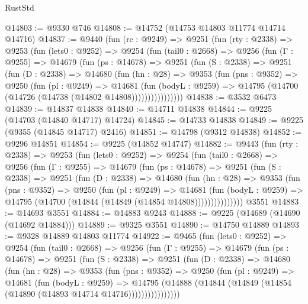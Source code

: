 \begin{lexlean}{RustStd}
\begin{coremodule}
@14803 := @9330 @746
@14808 := @14752 (@14753 @14803 @11774 @14714 @14716)
@14837 := @9440
    (fun (rc : @9249) =>
    @9251
      (fun (rty : @2338) =>
      @9253
        (fun (lets0 : @9252) =>
        @9254
          (fun (tail0 : @2668) =>
          @9256
            (fun (Γ : @9255) =>
            @14679
              (fun (ps : @14678) =>
              @9251
                (fun (S : @2338) =>
                @9251
                  (fun (D : @2338) =>
                  @14680
                    (fun (hn : @28) =>
                    @9353
                      (fun (pns : @9352) =>
                      @9250
                        (fun (pl : @9249) =>
                        @14681
                          (fun (bodyL : @9259) =>
                          @14795 (@14700 (@14726 (@14738 (@14802 @14808))))))))))))))))
@14838 := @3532 @6473
@14839 := @14837 @14838
@14840 := @14711 @14838
@14844 := @9225 (@14703 (@14840 @14717) @14724)
@14845 := @14733 @14838
@14849 := @9225 (@9355 (@14845 @14717) @2416)
@14851 := @14798 (@9312 @14838)
@14852 := @9296 @14851
@14854 := @9225 (@14852 @14747)
@14882 := @9443
    (fun (rty : @2338) =>
    @9253
      (fun (lets0 : @9252) =>
      @9254
        (fun (tail0 : @2668) =>
        @9256
          (fun (Γ : @9255) =>
          @14679
            (fun (ps : @14678) =>
            @9251
              (fun (S : @2338) =>
              @9251
                (fun (D : @2338) =>
                @14680
                  (fun (hn : @28) =>
                  @9353
                    (fun (pns : @9352) =>
                    @9250
                      (fun (pl : @9249) =>
                      @14681
                        (fun (bodyL : @9259) =>
                        @14795 (@14700 (@14844 (@14849 (@14854 @14808)))))))))))))))
    @3551
@14883 := @14693 @3551
@14884 := @14883 @9243
@14888 := @9225 (@14689 (@14690 (@14692 @14884)))
@14889 := @9325 @3551
@14890 := @14750 @14889
@14893 := @9328 @14889 @14803 @11774
@14922 := @9465
    (fun (lets0 : @9252) =>
    @9254
      (fun (tail0 : @2668) =>
      @9256
        (fun (Γ : @9255) =>
        @14679
          (fun (ps : @14678) =>
          @9251
            (fun (S : @2338) =>
            @9251
              (fun (D : @2338) =>
              @14680
                (fun (hn : @28) =>
                @9353
                  (fun (pns : @9352) =>
                  @9250
                    (fun (pl : @9249) =>
                    @14681
                      (fun (bodyL : @9259) =>
                      @14795
                        (@14888
                          (@14844 (@14849 (@14854 (@14890 (@14893 @14714 @14716))))))))))))))))

\end{coremodule}
\end{lexlean}
